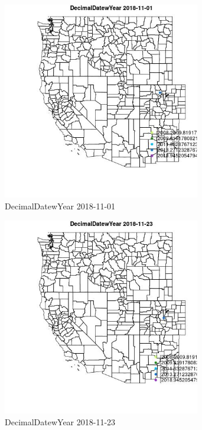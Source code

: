 \begin{figure} 
\centering  
\includegraphics[width=0.77\textwidth]{Code_Outputs/Report_ML_input_PM25_Step4_part_e_de_duplicated_aves_MapObsDecimalDatewYear2018-11-01.jpg} 
\caption{\label{fig:Report_ML_input_PM25_Step4_part_e_de_duplicated_avesMapObsDecimalDatewYear2018-11-01}DecimalDatewYear 2018-11-01} 
\end{figure} 
 

\clearpage 

\begin{figure} 
\centering  
\includegraphics[width=0.77\textwidth]{Code_Outputs/Report_ML_input_PM25_Step4_part_e_de_duplicated_aves_MapObsDecimalDatewYear2018-11-23.jpg} 
\caption{\label{fig:Report_ML_input_PM25_Step4_part_e_de_duplicated_avesMapObsDecimalDatewYear2018-11-23}DecimalDatewYear 2018-11-23} 
\end{figure} 
 

